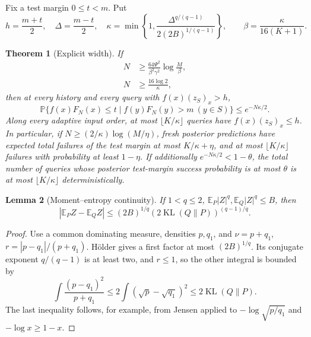 \documentclass[11pt]{article}
\newtheorem{theorem}{Theorem}
\newtheorem{lemma}[theorem]{Lemma}
\newcommand{\KL}{\operatorname{KL}}
\newcommand{\E}{\mathbb E}
\newcommand{\Pp}{\mathbb P}
\begin{document}
Fix a test margin $0\le t<m$. Put
\[
 h=\frac{m+t}{2},\quad\Delta=\frac{m-t}{2},\quad
 \kappa=\min\left\{1,
 \frac{\Delta^{q/(q-1)}}{2(2B)^{1/(q-1)}}\right\},\qquad
 \beta=\frac{\kappa}{16(K+1)}.
\]
\begin{theorem}[Explicit width]
If
\begin{align}
 N&\ge\frac{64\Psi^2}{\beta^2\gamma^2}
          \log\frac M\beta,\label{eq:width1}\\
 N&\ge\frac{16\log2}{\kappa},\label{eq:width2}
\end{align}
then at every history and every query with $f(x)(z_S)_x>h$,
\[
 \Pp\{f(x)F_N(x)\le t\mid f(y)F_N(y)>m\ (y\in S)\}
 \le e^{-N\kappa/2}.
\]
Along every adaptive input order, at most $\lfloor K/\kappa\rfloor$
queries have $f(x)(z_S)_x\le h$. In particular, if
$N\ge(2/\kappa)\log(M/\eta)$, fresh posterior predictions have expected
total failures of the test margin at most $K/\kappa+\eta$, and at most
$\lfloor K/\kappa\rfloor$ failures with probability at least $1-\eta$.
If additionally $e^{-N\kappa/2}<1-\theta$, the total number of queries
whose posterior test-margin success probability is at most $\theta$
is at most $\lfloor K/\kappa\rfloor$ deterministically.
\end{theorem}

\begin{lemma}[Moment--entropy continuity]
If $1<q\le2$, $\E_P|Z|^q,\E_Q|Z|^q\le B$, then
\[
 |\E_PZ-\E_QZ|\le(2B)^{1/q}
             (2\KL(Q\|P))^{(q-1)/q}.
\]
\end{lemma}
\begin{proof}
Use a common dominating measure, densities $p,q_1$, and
$\nu=p+q_1$, $r=|p-q_1|/(p+q_1)$. H\"older gives a first factor at
most $(2B)^{1/q}$. Its conjugate exponent $q/(q-1)$ is at least two,
and $r\le1$, so the other integral is bounded by
\[
 \int\frac{(p-q_1)^2}{p+q_1}
 \le2\int(\sqrt p-\sqrt {q_1})^2\le2\KL(Q\|P).
\]
The last inequality follows, for example, from Jensen applied to
$-\log\sqrt{p/q_1}$ and $-\log x\ge1-x$.
\end{proof}
\end{document}
